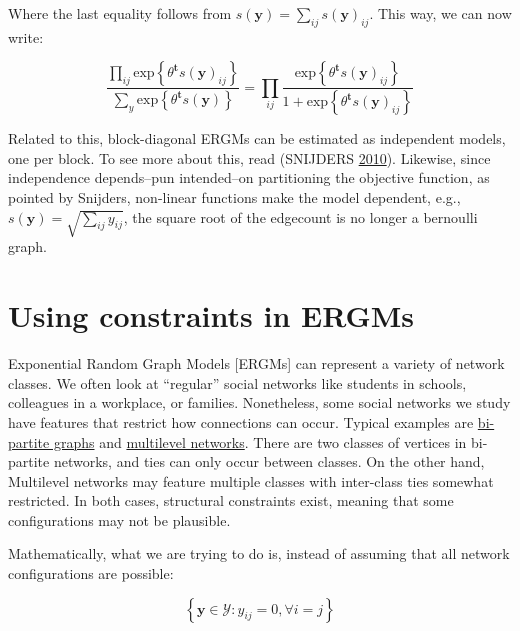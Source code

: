 \documentclass[]{book}
\begin{document}
Where the last equality follows from \(s\left(\mathbf{y}\right) = \sum_{ij}{s\left(\mathbf{y}\right)_{ij}}\). This way, we can now write:

\begin{equation}
\frac{\prod_{ij}\mbox{exp}\left\{{\theta}^\mathbf{t}s\left(\mathbf{y}\right)_{ij}\right\}}{\sum_{y}\mbox{exp}\left\{{\theta}^\mathbf{t}s\left(\mathbf{y}\right)\right\}} = 
\prod_{ij}\frac{\mbox{exp}\left\{{\theta}^\mathbf{t}s\left(\mathbf{y}\right)_{ij}\right\}}{1 + \mbox{exp}\left\{{\theta}^\mathbf{t}s\left(\mathbf{y}\right)_{ij}\right\}}
\end{equation}

Related to this, block-diagonal ERGMs can be estimated as independent models, one per block. To see more about this, read (SNIJDERS \protect\hyperlink{ref-Snijders2010margin}{2010}). Likewise, since independence depends--pun intended--on partitioning the objective function, as pointed by Snijders, non-linear functions make the model dependent, e.g., \(s\left(\mathbf{y}\right) = \sqrt{\sum_{ij}y_{ij}}\), the square root of the edgecount is no longer a bernoulli graph.

\hypertarget{using-constraints-in-ergms}{%
\chapter{Using constraints in ERGMs}\label{using-constraints-in-ergms}}

Exponential Random Graph Models {[}ERGMs{]} can represent a variety of
network classes. We often look at ``regular'' social networks
like students in schools, colleagues in a workplace, or families. Nonetheless,
some social networks we study have features that restrict how connections can
occur. Typical examples are \href{https://en.wikipedia.org/wiki/Bipartite_graph}{bi-partite graphs}
and \href{https://cran.r-project.org/web/packages/mlergm/vignettes/mlergm_tutorial.html}{multilevel networks}.
There are two classes of vertices in bi-partite networks, and ties can only
occur between classes. On the other hand, Multilevel networks may feature
multiple classes with inter-class ties somewhat restricted. In both cases,
structural constraints exist, meaning that some configurations may not
be plausible.

Mathematically, what we are trying to do is, instead of assuming that
all network configurations are possible:

\[
\left\{\mathbf{y} \in \mathcal{Y}: y_{ij} = 0, \forall i = j\right\}
\]
\end{document}

